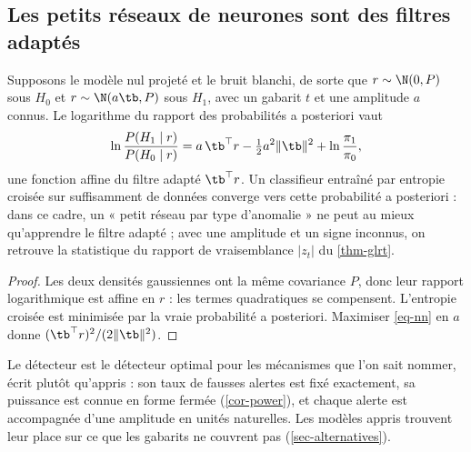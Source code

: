 \subsection{Les petits réseaux de neurones sont des filtres adaptés}
\begin{proposition}\label{prop-nn}
Supposons le modèle nul projeté et le bruit blanchi, de sorte que $r\sim\N(0,P)$ sous $H_0$ et $r\sim\N(a\tb,P)$ sous $H_1$,
avec un gabarit $t$ et une amplitude $a$ connus. Le logarithme du rapport des probabilités a posteriori vaut
\begin{equation}\label{eq-nn}
\ln\frac{P(H_1\mid r)}{P(H_0\mid r)}=a\,\tb^\top r-\tfrac12a^2\|\tb\|^2+\ln\frac{\pi_1}{\pi_0},
\end{equation}
une fonction affine du filtre adapté $\tb^\top r$. Un classifieur entraîné par entropie croisée sur suffisamment de données
converge vers cette probabilité a posteriori : dans ce cadre, un « petit réseau par type d'anomalie » ne peut au mieux
qu'apprendre le filtre adapté ; avec une amplitude et un signe inconnus, on retrouve la statistique du rapport de
vraisemblance $|z_t|$ du \cref{thm-glrt}.
\end{proposition}
\begin{proof}
Les deux densités gaussiennes ont la même covariance $P$, donc leur rapport logarithmique est affine en $r$ : les termes
quadratiques se compensent. L'entropie croisée est minimisée par la vraie probabilité a posteriori. Maximiser
\cref{eq-nn} en $a$ donne $(\tb^\top r)^2/(2\|\tb\|^2)$.
\end{proof}

\begin{insight}
Le détecteur est le détecteur optimal pour les mécanismes que l'on sait nommer, écrit plutôt qu'appris : son taux de
fausses alertes est fixé exactement, sa puissance est connue en forme fermée (\cref{cor-power}), et chaque alerte est
accompagnée d'une amplitude en unités naturelles. Les modèles appris trouvent leur place sur ce que les gabarits ne
couvrent pas (\cref{sec-alternatives}).
\end{insight}

